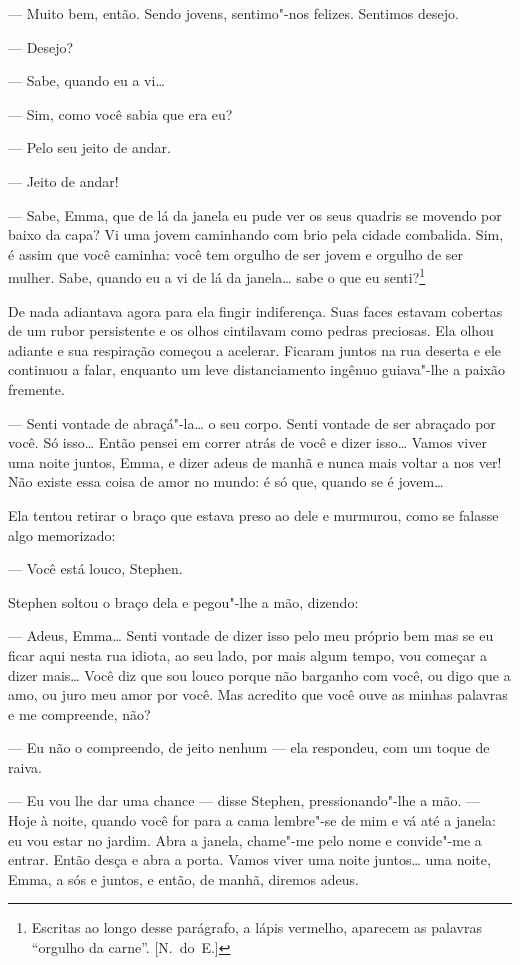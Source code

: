 --- Muito bem, então.  Sendo jovens, sentimo"-nos felizes.  Sentimos desejo.

--- Desejo?

--- Sabe, quando eu a vi\ldots{}

--- Sim, como você sabia que era eu?

--- Pelo seu jeito de andar.

--- Jeito de andar!

--- Sabe, Emma, que de lá da janela eu pude ver os seus quadris se movendo por
baixo da capa?  Vi uma jovem caminhando com brio pela cidade combalida.  Sim, é
assim que você caminha: você tem orgulho de ser jovem e orgulho de ser mulher.
Sabe, quando eu a vi de lá da janela\ldots{} sabe o que eu senti?\footnote{ Escritas
ao longo desse parágrafo, a lápis vermelho, aparecem as palavras “orgulho da
carne”.  [N.~do~E.]}

De nada adiantava agora para ela fingir indiferença.  Suas faces estavam
cobertas de um rubor persistente e os olhos cintilavam como pedras preciosas.
Ela olhou adiante e sua respiração começou a acelerar.  Ficaram juntos na rua
deserta e ele continuou a falar, enquanto um leve distanciamento ingênuo
guiava"-lhe a paixão fremente.

--- Senti vontade de abraçá"-la\ldots{} o seu corpo.  Senti vontade de ser abraçado
por você.  Só isso\ldots{}  Então pensei em correr atrás de você e dizer isso\ldots{}
Vamos viver uma noite juntos, Emma, e dizer adeus de manhã e nunca mais voltar
a nos ver!  Não existe essa coisa de amor no mundo: é só que, quando se é
jovem\ldots{}

Ela tentou retirar o braço que estava preso ao dele e murmurou, como se falasse
algo memorizado:

--- Você está louco, Stephen.

Stephen soltou o braço dela e pegou"-lhe a mão, dizendo:

--- Adeus, Emma\ldots{}  Senti vontade de dizer isso pelo meu próprio bem mas se eu
ficar aqui nesta rua idiota, ao seu lado, por mais algum tempo, vou começar a
dizer mais\ldots{}  Você diz que sou louco porque não barganho com você, ou digo que
a amo, ou juro meu amor por você.  Mas acredito que você ouve as minhas
palavras e me compreende, não?

--- Eu não o compreendo, de jeito nenhum --- ela respondeu, com um toque de
raiva.

--- Eu vou lhe dar uma chance --- disse Stephen, pressionando"-lhe a mão.  ---
Hoje à noite, quando você for para a cama lembre"-se de mim e vá até a janela:
eu vou estar no jardim.  Abra a janela, chame"-me pelo nome e convide"-me a
entrar.  Então desça e abra a porta.  Vamos viver uma noite juntos\ldots{} uma
noite, Emma, a sós e juntos, e então, de manhã, diremos adeus.

